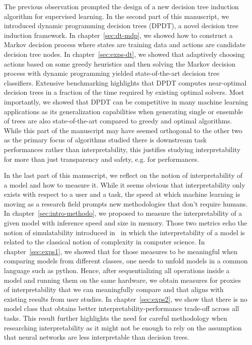 The previous observation prompted the design of a new decision tree induction algorithm for supervised learning.
In the second part of this manuscript, we introduced dynamic programming decision trees (DPDT), a novel decision tree induction framework.
In chapter~\ref{sec:dt-mdp}, we showed how to construct a Markov decision process where states are training data and actions are candidate decision tree nodes.
In chapter~\ref{sec:exps-dt}, we showed that adaptively choosing actions based on some greedy heuristics and then solving the Markov decision process with dynamic programming yielded state-of-the-art decision tree classifiers.
Extensive benchmarking highlights that DPDT computes near-optimal decision trees in a fraction of the time required by existing optimal solvers.
Most importantly, we showed that DPDT can be competitive in many machine learning applications as its generalization capabilities when generating single or ensemble of trees are also state-of-the-art compared to greedy and optimal algorithms.
While this part of the manuscript may have seemed orthogonal to the other two as the primary focus of algorithms studied there is downstream task performances rather than interpretability, this justifies studying interpretability for more than just transparency and safety, e.g. for performances.

In the last part of this manuscript, we reflect on the notion of interpretability of a model and how to measure it.
While it seems obvious that interpretability only exists with respect to a user and a task, the speed at which machine learning is moving as a research field prompts new methodologies that don't require humans.
In chapter~\ref{sec:intro-methodo}, we proposed to measure the interpretability of a given model with inference speed and size in memory.
Those two metrics echo the notion of simulatability introduced in~\cite{lipton} in which the interpretability of a model is related to the classical notion of complexity in computer science.
In chapter~\ref{sec:exps1}, we showed that for those measures to be meaningful when comparing models from different classes, one needs to unfold models in a common language such as python.
Hence, after sequentializing all operations inside a model and running them on the same hardware, we obtain measures for proxies of interpretability that we can meaningfully compare and that aligns with existing results from user studies.
In chapter~\ref{sec:exps2}, we show that there is no model class that obtains better interpretability-performance trade-off across all tasks.
This result further highlights the need for careful methodology when researching interpretability as it might not be enough to rely on the assumption that neural networks are less interpretable than decision trees.

